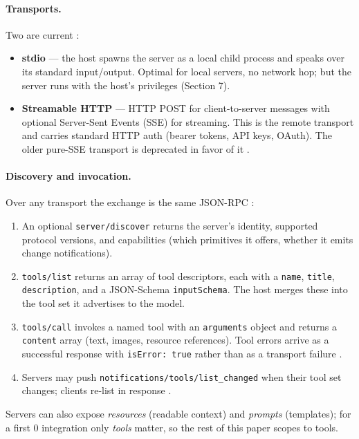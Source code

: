 \documentclass[11pt]{article}
\begin{document}
\paragraph{Transports.} Two are current \cite{mcp-arch}:
\begin{itemize}[leftmargin=*]
  \item \textbf{stdio} --- the host spawns the server as a local child process
  and speaks over its standard input/output. Optimal for local servers, no
  network hop; but the server runs with the host's privileges (Section 7).
  \item \textbf{Streamable HTTP} --- HTTP POST for client-to-server messages
  with optional Server-Sent Events (SSE) for streaming. This is the remote
  transport and carries standard HTTP auth (bearer tokens, API keys, OAuth).
  The older pure-SSE transport is deprecated in favor of it
  \cite{claudecode-mcp}.
\end{itemize}

\paragraph{Discovery and invocation.} Over any transport the exchange is the
same JSON-RPC \cite{mcp-arch}:
\begin{enumerate}[leftmargin=*]
  \item An optional \texttt{server/discover} returns the server's identity,
  supported protocol versions, and capabilities (which primitives it offers,
  whether it emits change notifications).
  \item \texttt{tools/list} returns an array of tool descriptors, each with a
  \texttt{name}, \texttt{title}, \texttt{description}, and a JSON-Schema
  \texttt{inputSchema}. The host merges these into the tool set it advertises to
  the model.
  \item \texttt{tools/call} invokes a named tool with an \texttt{arguments}
  object and returns a \texttt{content} array (text, images, resource
  references). Tool errors arrive as a successful response with
  \texttt{isError: true} rather than as a transport failure
  \cite{mcp-clientbp}.
  \item Servers may push \texttt{notifications/tools/list\_changed} when their
  tool set changes; clients re-list in response \cite{mcp-arch}.
\end{enumerate}

Servers can also expose \emph{resources} (readable context) and \emph{prompts}
(templates); for a first 0 integration only \emph{tools} matter, so the rest
of this paper scopes to tools.
\end{document}
